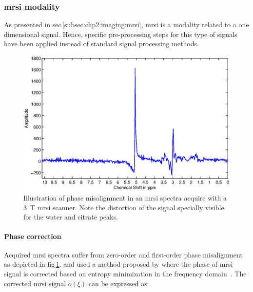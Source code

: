 
\subsubsection{\acs*{mrsi} modality}

As presented in \acs{sec}\,\ref{subsec:chp2:imaging:mrsi}, \ac{mrsi} is a modality related to a one dimensional signal.
Hence, specific pre-processing steps for this type of signals have been applied instead of standard signal processing methods.


\begin{figure}
  \centering
  \includegraphics[width=0.7\linewidth]{3_review/figures/processing/pre-processing/phase/phase.eps}
  \caption[Illustration of phase malignant in an \acs*{mrsi} spectra.]{Illustration of phase misalignment in an \acs*{mrsi} spectra acquire with a \SI{3}{\tesla} \ac*{mrsi} scanner. Note the distortion of the signal specially visible for the water and citrate peaks.}
  \label{fig:phase}
\end{figure}

\paragraph{Phase correction} Acquired \ac{mrsi} spectra suffer from zero-order and first-order phase misalignment~\cite{Chen2002,Osorio-Garcia2012} as depicted in \acs{fig}\,\ref{fig:phase}. 
\citeauthor{Parfait2012} and \citeauthor{trigui2017automatic} used a method proposed by \citeauthor{Chen2002} where the phase of \ac{mrsi} signal is corrected based on entropy minimization in the frequency domain~\cite{Parfait2012,trigui2016classification,trigui2017automatic}.
The corrected \ac{mrsi} signal $o(\xi)$ can be expressed as:

